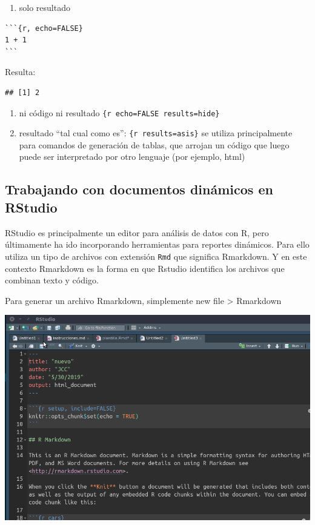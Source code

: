 \documentclass[11pt,]{book}
\providecommand{\tightlist}{%
  \setlength{\itemsep}{0pt}\setlength{\parskip}{0pt}}
\begin{document}
\begin{enumerate}
\def\labelenumi{\arabic{enumi}.}
\setcounter{enumi}{2}
\tightlist
\item
  solo resultado
\end{enumerate}

\begin{verbatim}
```{r, echo=FALSE}
1 + 1
```
\end{verbatim}

Resulta:

\begin{verbatim}
## [1] 2
\end{verbatim}

\begin{enumerate}
\def\labelenumi{\arabic{enumi}.}
\setcounter{enumi}{3}
\tightlist
\item
  ni código ni resultado \texttt{\{r\ echo=FALSE\ results=\textquotesingle{}hide\textquotesingle{}\}}
\item
  resultado ``tal cual como es'': \texttt{\{r\ results=\textquotesingle{}asis\textquotesingle{}\}} se utiliza principalmente para comandos de generación de tablas, que arrojan un código que luego puede ser interpretado por otro lenguaje (por ejemplo, html)
\end{enumerate}

\hypertarget{trabajando-con-documentos-dinuxe1micos-en-rstudio}{%
\subsection{Trabajando con documentos dinámicos en RStudio}\label{trabajando-con-documentos-dinuxe1micos-en-rstudio}}

RStudio es principalmente un editor para análisis de datos con R, pero últimamente ha ido incorporando herramientas para reportes dinámicos. Para ello utiliza un tipo de archivos con extensión \texttt{Rmd} que significa Rmarkdown. Y en este contexto Rmarkdown es la forma en que Rstudio identifica los archivos que combinan texto y código.

Para generar un archivo Rmarkdown, simplemente new file \textgreater{} Rmarkdown

\includegraphics{images/rmarkdown.gif}
\end{document}
